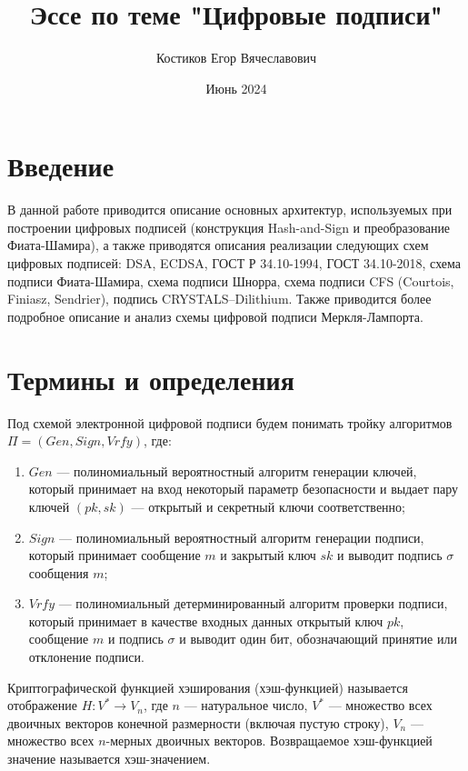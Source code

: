 \documentclass{./civarticle}
\title{Эссе по теме "Цифровые подписи"}
\author{Костиков Егор Вячеславович}
\date{Июнь 2024}
\begin{document}
\maketitle

\section{Введение}

В данной работе приводится описание основных архитектур, используемых при построении цифровых подписей (конструкция Hash-and-Sign и преобразование Фиата-Шамира), а также приводятся описания реализации следующих схем цифровых подписей: DSA, ECDSA, ГОСТ Р 34.10-1994, ГОСТ 34.10-2018, схема подписи Фиата-Шамира, схема подписи Шнорра, схема подписи CFS (Courtois, Finiasz, Sendrier), подпись CRYSTALS–Dilithium. Также приводится более подробное описание и анализ схемы цифровой подписи Меркля-Лампорта.

\section{Термины и определения}

Под схемой электронной цифровой подписи будем понимать тройку алгоритмов $\Pi = (Gen, Sign, Vrfy)$, где:

\begin{enumerate}
    \item $Gen$ --- полиномиальный вероятностный алгоритм генерации ключей, который принимает на вход некоторый параметр безопасности и выдает пару ключей $(pk, sk)$ — открытый и секретный ключи соответственно;
    \item $Sign$ --- полиномиальный вероятностный алгоритм генерации подписи, который принимает сообщение $m$ и закрытый ключ $sk$ и выводит подпись $\sigma$ сообщения $m$;
    \item $Vrfy$ --- полиномиальный детерминированный алгоритм проверки подписи, который принимает в качестве входных данных открытый ключ $pk$, сообщение $m$ и подпись $\sigma$ и выводит один бит, обозначающий принятие или отклонение подписи.

\end{enumerate}

Криптографической функцией хэширования (хэш-функцией) называется отображение $H: V^{*} \rightarrow V_n$, где $n$ --- натуральное число, $V^{*}$ --- множество всех двоичных векторов конечной размерности (включая пустую строку), $V_n$ --- множество всех $n$-мерных двоичных векторов. Возвращаемое хэш-функцией значение называется хэш-значением.
\end{document}
